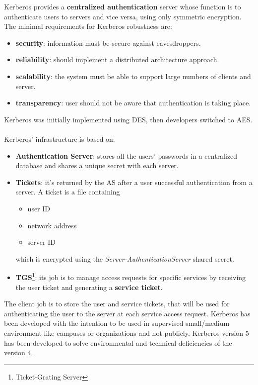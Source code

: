 \documentclass[oneside]{academica}
\begin{document}
Kerberos provides a \textbf{centralized authentication} server whose function is to authenticate users to servers and vice versa, using only symmetric encryption.
The minimal requirements for Kerberos robustness are:
\begin{itemize}
  \item \textbf{security}: information must be secure against eavesdroppers.
  \item \textbf{reliability}: should implement a distributed architecture approach.
  \item \textbf{scalability}: the system must be able to support large numbers of clients and server.
  \item \textbf{transparency}: user should not be aware that authentication is taking place.
\end{itemize}
Kerberos was initially implemented using DES, then developers switched to AES.
\\\\
Kerberos' infrastructure is based on:
\begin{itemize}
  \item \textbf{Authentication Server}: stores all the users' passwords in a centralized database and shares a unique secret with each server.
  \item \textbf{Tickets}: it's returned by the AS after a user successful authentication from a server. A ticket is a file containing
    \vspace{-5pt}
    \begin{itemize}
      \item user ID
      \item network address
      \item server ID
    \end{itemize}
    which is encrypted using the \textit{Server-AuthenticationServer} shared secret.
  \item \textbf{TGS}\footnote{Ticket-Grating Server}: its job is to manage access requests for specific services by receiving the user ticket and generating a \textbf{service ticket}.
\end{itemize}
The client job is to store the user and service tickets, that will be used for authenticating the user to the server at each service access request.
Kerberos has been developed with the intention to be used in supervised small/medium environment like campuses or organizations and not publicly.
Kerberos version 5 has been developed to solve environmental and technical deficiencies of the version 4.
\end{document}
